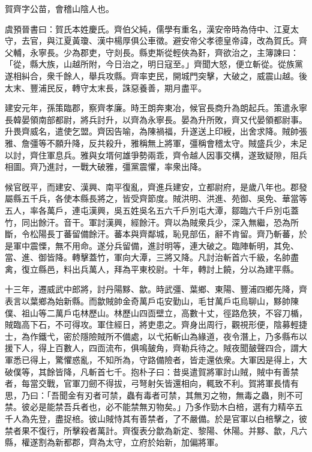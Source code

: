 
\begin{pinyinscope}
賀齊字公苗，會稽山陰人也。

虞預晉書曰：賀氏本姓慶氏。齊伯父純，儒學有重名，漢安帝時為侍中、江夏太守，去官，與江夏黃瓊、漢中楊厚俱公車徵。避安帝父孝德皇帝諱，改為賀氏。齊父輔，永寧長。少為郡吏，守剡長。縣吏斯從輕俠為姧，齊欲治之，主簿諫曰：「從，縣大族，山越所附，今日治之，明日寇至。」齊聞大怒，便立斬從。從族黨遂相糾合，衆千餘人，舉兵攻縣。齊率吏民，開城門突擊，大破之，威震山越。後太末、豐浦民反，轉守太末長，誅惡養善，期月盡平。

建安元年，孫策臨郡，察齊孝廉。時王朗奔東冶，候官長商升為朗起兵。策遣永寧長韓晏領南部都尉，將兵討升，以齊為永寧長。晏為升所敗，齊又代晏領都尉事。升畏齊威名，遣使乞盟。齊因告喻，為陳禍福，升遂送上印綬，出舍求降。賊帥張雅、詹彊等不願升降，反共殺升，雅稱無上將軍，彊稱會稽太守。賊盛兵少，未足以討，齊住軍息兵。雅與女壻何雄爭勢兩乖，齊令越人因事交構，遂致疑隙，阻兵相圖。齊乃進討，一戰大破雅，彊黨震懼，率衆出降。

候官旣平，而建安、漢興、南平復亂，齊進兵建安，立都尉府，是歲八年也。郡發屬縣五千兵，各使本縣長將之，皆受齊節度。賊洪明、洪進、苑御、吳免、華當等五人，率各萬戶，連屯漢興，吳五姓吳名五六千戶別屯大潭，鄒臨六千戶別屯蓋竹，同出餘汗。音干。軍討漢興，經餘汗。齊以為賊衆兵少，深入無繼，恐為所斷，令松陽長丁蕃留備餘汗。蕃本與齊鄰城，恥見部伍，辭不肯留。齊乃斬蕃，於是軍中震慄，無不用命。遂分兵留備，進討明等，連大破之。臨陣斬明，其免、當、進、御皆降。轉擊蓋竹，軍向大潭，三將又降。凡討治斬首六千級，名帥盡禽，復立縣邑，料出兵萬人，拜為平東校尉。十年，轉討上饒，分以為建平縣。

十三年，遷威武中郎將，討丹陽黟、歙。時武彊、葉鄉、東陽、豐浦四鄉先降，齊表言以葉鄉為始新縣。而歙賊帥金奇萬戶屯安勤山，毛甘萬戶屯烏聊山，黟帥陳僕、祖山等二萬戶屯林歷山。林歷山四靣壁立，高數十丈，徑路危狹，不容刀楯，賊臨高下石，不可得攻。軍住經日，將吏患之。齊身出周行，觀視形便，陰募輕捷士，為作鐵弋，密於隱險賊所不備處，以弋拓斬山為緣道，夜令潛上，乃多縣布以援下人，得上百數人，四靣流布，俱鳴皷角，齊勒兵待之。賊夜聞皷聲四合，謂大軍悉已得上，驚懼惑亂，不知所為，守路備險者，皆走還依衆。大軍因是得上，大破僕等，其餘皆降，凡斬首七千。抱朴子曰：昔吳遣賀將軍討山賊，賊中有善禁者，每當交戰，官軍刀劒不得拔，弓弩射矢皆還相向，輒致不利。賀將軍長情有思，乃曰：「吾聞金有刃者可禁，蟲有毒者可禁，其無刃之物，無毒之蟲，則不可禁。彼必是能禁吾兵者也，必不能禁無刃物矣。」乃多作勁木白棓，選有力精卒五千人為先登，盡捉棓。彼山賊恃其有善禁者，了不嚴備。於是官軍以白棓擊之，彼禁者果不復行，所擊殺者萬計。齊復表分歙為新定、黎陽、休陽。并黟、歙，凡六縣，權遂割為新都郡，齊為太守，立府於始新，加偏將軍。


\end{pinyinscope}
